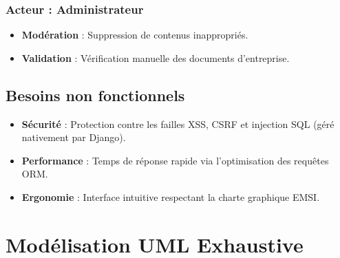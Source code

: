 \documentclass[12pt,a4paper]{report}
\begin{document}
\subsubsection{Acteur : Administrateur}
\begin{itemize}
    \item \textbf{Modération} : Suppression de contenus inappropriés.
    \item \textbf{Validation} : Vérification manuelle des documents d'entreprise.
\end{itemize}

\subsection{Besoins non fonctionnels}
\begin{itemize}
    \item \textbf{Sécurité} : Protection contre les failles XSS, CSRF et injection SQL (géré nativement par Django).
    \item \textbf{Performance} : Temps de réponse rapide via l'optimisation des requêtes ORM.
    \item \textbf{Ergonomie} : Interface intuitive respectant la charte graphique EMSI.
\end{itemize}

\section{Modélisation UML Exhaustive}
\end{document}
